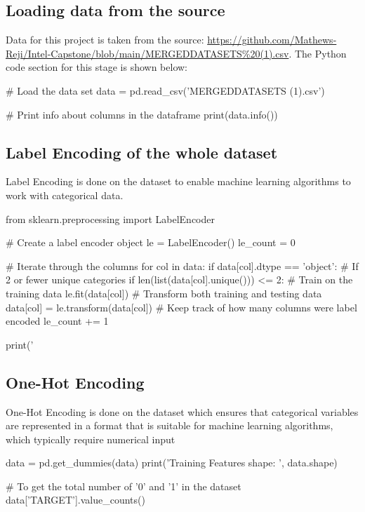 \documentclass{josis}
\begin{document}
{\subsection{Loading data from the source}
Data for this project is taken from the source: \url{https://github.com/Mathews-Reji/Intel-Capstone/blob/main/MERGEDDATASETS%20(1).csv}. The Python code section for this stage is shown below:
\begin{python}
# Load the data set 
data = pd.read_csv('MERGEDDATASETS (1).csv') 

# Print info about columns in the dataframe 
print(data.info()) 
\end{python}

\subsection{Label Encoding of the whole dataset}
Label Encoding is done on the dataset to enable machine learning algorithms to work with categorical data.
\begin{python}
from sklearn.preprocessing import LabelEncoder

# Create a label encoder object
le = LabelEncoder()
le_count = 0

# Iterate through the columns
for col in data:
    if data[col].dtype == 'object':
        # If 2 or fewer unique categories
        if len(list(data[col].unique())) <= 2:
            # Train on the training data
            le.fit(data[col])
            # Transform both training and testing data
            data[col] = le.transform(data[col])
            # Keep track of how many columns were label encoded
            le_count += 1

print('%
\end{python}

\subsection{One-Hot Encoding}
One-Hot Encoding is done on the dataset which ensures that categorical variables are represented in a format that is suitable for machine learning algorithms, which typically require numerical input
\begin{python}
data = pd.get_dummies(data)
print('Training Features shape: ', data.shape)

# To get the total number of '0' and '1' in the dataset
data['TARGET'].value_counts()
\end{python}

}
\end{document}
